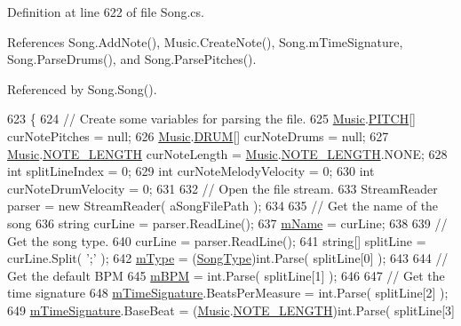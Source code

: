 Definition at line 622 of file Song.\+cs.



References Song.\+Add\+Note(), Music.\+Create\+Note(), Song.\+m\+Time\+Signature, Song.\+Parse\+Drums(), and Song.\+Parse\+Pitches().



Referenced by Song.\+Song().


\begin{DoxyCode}
623     \{
624         \textcolor{comment}{// Create some variables for parsing the file.}
625         \hyperlink{class_music}{Music}.\hyperlink{group___music_enums_ga508f69b199ea518f935486c990edac1d}{PITCH}[] curNotePitches = null;
626         \hyperlink{class_music}{Music}.\hyperlink{group___music_enums_gade475b4382c7066d1af13e7c13c029b6}{DRUM}[] curNoteDrums = null;
627         \hyperlink{class_music}{Music}.\hyperlink{group___music_enums_gaf11b5f079adbb21c800b9eca1c5c3cbd}{NOTE\_LENGTH} curNoteLength = \hyperlink{class_music}{Music}.\hyperlink{group___music_enums_gaf11b5f079adbb21c800b9eca1c5c3cbd}{NOTE\_LENGTH}.NONE;
628         \textcolor{keywordtype}{int} splitLineIndex = 0;
629         \textcolor{keywordtype}{int} curNoteMelodyVelocity = 0;
630         \textcolor{keywordtype}{int} curNoteDrumVelocity = 0;
631 
632         \textcolor{comment}{// Open the file stream.}
633         StreamReader parser = \textcolor{keyword}{new} StreamReader( aSongFilePath );
634 
635         \textcolor{comment}{// Get the name of the song}
636         \textcolor{keywordtype}{string} curLine = parser.ReadLine();
637         \hyperlink{group___song_priv_var_ga6a5e6c1e4aa92939e2b5c1e3d9908df8}{mName} = curLine;
638 
639         \textcolor{comment}{// Get the song type.}
640         curLine = parser.ReadLine();
641         \textcolor{keywordtype}{string}[] splitLine = curLine.Split( \textcolor{charliteral}{';'} );
642         \hyperlink{group___song_priv_var_gaf3b9d0f461522324f897b746311b43c5}{mType} = (\hyperlink{group___song_enums_gae681a1f001333e39fc1cb4fea97bfe1b}{SongType})\textcolor{keywordtype}{int}.Parse( splitLine[0] );
643 
644         \textcolor{comment}{// Get the default BPM}
645         \hyperlink{group___song_priv_var_ga3341fbbd9c0c58fe6514623e6b6c5a1e}{mBPM} = \textcolor{keywordtype}{int}.Parse( splitLine[1] );
646 
647         \textcolor{comment}{// Get the time signature}
648         \hyperlink{group___song_priv_var_ga2b2dcc0e83e49f7303b6a1371877b25e}{mTimeSignature}.BeatsPerMeasure = \textcolor{keywordtype}{int}.Parse( splitLine[2] );
649         \hyperlink{group___song_priv_var_ga2b2dcc0e83e49f7303b6a1371877b25e}{mTimeSignature}.BaseBeat = (\hyperlink{class_music}{Music}.\hyperlink{group___music_enums_gaf11b5f079adbb21c800b9eca1c5c3cbd}{NOTE\_LENGTH})\textcolor{keywordtype}{int}.Parse( splitLine[3] 

\end{DoxyCode}
